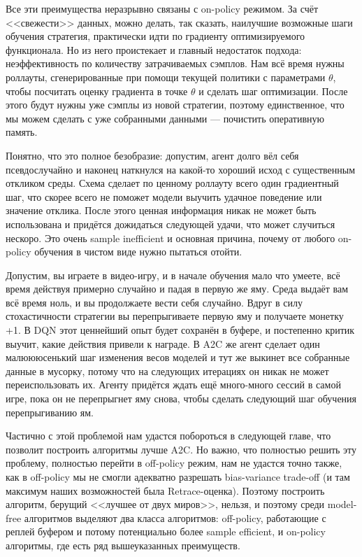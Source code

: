 Все эти преимущества неразрывно связаны с on-policy режимом. За счёт <<свежести>> данных, можно делать, так сказать, наилучшие возможные шаги обучения стратегия, практически идти по градиенту оптимизируемого функционала. Но из него проистекает и главный недостаток подхода: неэффективность по количеству затрачиваемых сэмплов. Нам всё время нужны роллауты, сгенерированные при помощи текущей политики с параметрами $\theta$, чтобы посчитать оценку градиента в точке $\theta$ и сделать шаг оптимизации. После этого будут нужны уже сэмплы из новой стратегии, поэтому единственное, что мы можем сделать с уже собранными данными --- почистить оперативную память.

Понятно, что это полное безобразие: допустим, агент долго вёл себя псевдослучайно и наконец наткнулся на какой-то хороший исход с существенным откликом среды. Схема сделает по ценному роллауту всего один градиентный шаг, что скорее всего не поможет модели выучить удачное поведение или значение отклика. После этого ценная информация никак не может быть использована и придётся дожидаться следующей удачи, что может случиться нескоро. Это очень sample inefficient и основная причина, почему от любого on-policy обучения в чистом виде нужно пытаться отойти.

\begin{example}
Допустим, вы играете в видео-игру, и в начале обучения мало что умеете, всё время действуя примерно случайно и падая в первую же яму. Среда выдаёт вам всё время ноль, и вы продолжаете вести себя случайно. Вдруг в силу стохастичности стратегии вы перепрыгиваете первую яму и получаете монетку +1. В DQN этот ценнейший опыт будет сохранён в буфере, и постепенно критик выучит, какие действия привели к награде. В A2C же агент сделает один малюююсенький шаг изменения весов моделей и тут же выкинет все собранные данные в мусорку, потому что на следующих итерациях он никак не может переиспользовать их. Агенту придётся ждать ещё много-много сессий в самой игре, пока он не перепрыгнет яму снова, чтобы сделать следующий шаг обучения перепрыгиванию ям.
\end{example}

Частично с этой проблемой нам удастся побороться в следующей главе, что позволит построить алгоритмы лучше A2C. Но важно, что полностью решить эту проблему, полностью перейти в off-policy режим, нам не удастся точно также, как в off-policy мы не смогли адекватно разрешать bias-variance trade-off (и там максимум наших возможностей была Retrace-оценка). Поэтому построить алгоритм, берущий <<лучшее от двух миров>>, нельзя, и поэтому среди model-free алгоритмов выделяют два класса алгоритмов: off-policy, работающие с реплей буфером и потому потенциально более sample efficient, и on-policy алгоритмы, где есть ряд вышеуказанных преимуществ.
